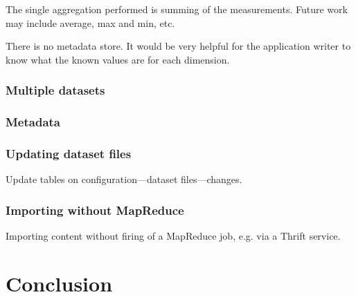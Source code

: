 \documentclass[a4paper,10pt]{book}
\begin{document}
The single aggregation performed is summing of the measurements. Future work may include average, max and min, etc.

There is no metadata store. It would be very helpful for the application writer to know what the known values are for each dimension.

\subsection{Multiple datasets}

\subsection{Metadata}

\subsection{Updating dataset files}

Update tables on configuration---dataset files---changes.

\subsection{Importing without MapReduce}

Importing content without firing of a MapReduce job, e.g. via a Thrift
service.



\chapter{Conclusion}



\pagebreak



 
\end{document}
